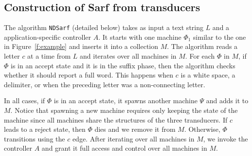 \documentclass[11pt]{article}
\newcommand{\CodeIn}[1]{{\small\texttt{#1}}}
\begin{document}
\subsection{Construction of Sarf from transducers}
\label{sec:ndfsa}

%
%

The algorithm \CodeIn{NDSarf} (detailed below)
takes as input a text string $L$ and a application-specific controller
$A$. 
It starts with one machine $\Phi_1$ similar to the one in 
Figure~\ref{f:example} and inserts it into a collection
$M$. 
The algorithm reads a letter $c$ at a time from $L$
and iterates over all machines in $M$. 
For each $\Phi$ in $M$,
if $\Phi$ is in an accept state and it is in the suffix
phase, then the algorithm checks whether it should report
a full word. 
This happens when $c$ is a white space, a delimiter, 
or when the preceding letter %
was a non-connecting letter. 

In all cases, if $\Phi$ is in an accept state, 
it spawns another machine $\Psi$ and adds it to $M$. 
Notice that spawning a new machine requires only keeping
the state of the machine since all machines share the
structures of the three transducers.
If $c$ leads to a reject state, then $\Phi$ dies 
and we remove it from $M$. 
Otherwise, $\Phi$ transitions using the $c$ edge.
After iterating over all machines in $M$, we invoke the 
controller $A$
and grant it full access and control over
all machines in $M$. 

\end{document}

